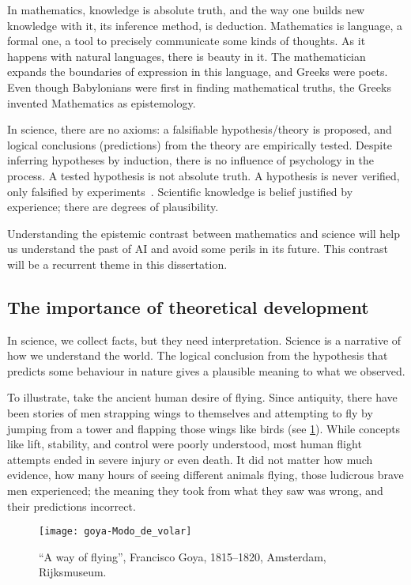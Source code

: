 In mathematics, knowledge is absolute truth, and the way one builds new knowledge with it, its inference method, is deduction.  Mathematics is language, a formal one, a tool to precisely communicate some kinds of thoughts. As it happens with natural languages, there is beauty in it. The mathematician expands the boundaries of expression in this language, and Greeks were poets. Even though Babylonians were first in finding mathematical truths, the Greeks invented Mathematics as epistemology.

In science, there are no axioms: a falsifiable hypothesis/theory is proposed, and logical conclusions (predictions) from the theory are empirically tested. Despite inferring hypotheses by induction, there is no influence of psychology in the process. A tested hypothesis is not absolute truth. A hypothesis is never verified, only falsified by experiments~\cite[p. 31-50]{popper:2004}. Scientific knowledge is belief justified by experience; there are degrees of plausibility.

Understanding the epistemic contrast between mathematics and science will help us understand the past of \acf{AI} and avoid some perils in its future. This contrast will be a recurrent theme in this dissertation.

\subsection{The importance of theoretical development} In science, we collect facts, but they need interpretation. Science is a narrative of how we understand the world\cite{gleiser:2018}. The logical conclusion from the hypothesis that predicts some behaviour in nature gives a plausible meaning to what we observed.

To illustrate, take the ancient human desire of flying. Since antiquity, there have been stories of men strapping wings to themselves and attempting to fly by jumping from a tower and flapping those wings like birds (see \cref{fig:goya}). While concepts like lift, stability, and control were poorly understood, most human flight attempts ended in severe injury or even death. It did not matter how much evidence, how many hours of seeing different animals flying, those ludicrous brave men experienced; the meaning they took from what they saw was wrong, and their predictions incorrect.
\begin{figure}
	[ht!] \centering
	\texttt{[image: goya-Modo\_de\_volar]}
	\caption{``A way of flying'', Francisco Goya, 1815--1820, Amsterdam, Rijksmuseum.}\label{fig:goya} \end{figure}


